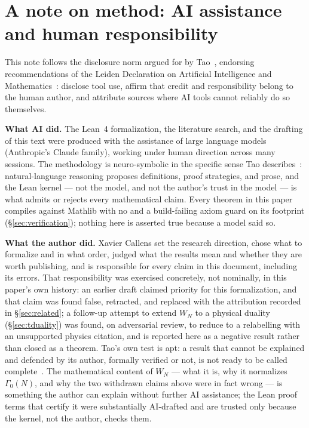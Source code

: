 \documentclass[11pt, a4paper]{article}
\newcommand{\lean}[1]{\ifmmode\text{\ttfamily\detokenize{#1}}\else{\ttfamily\detokenize{#1}}\fi}
\theoremstyle{remark}
\begin{document}
\section*{A note on method: AI assistance and human responsibility}

This note follows the disclosure norm argued for by Tao~\cite{Tao2026AI}, endorsing recommendations
of the Leiden Declaration on Artificial Intelligence and Mathematics~\cite{Leiden2026}: disclose
tool use, affirm that credit and responsibility belong to the human author, and attribute sources
where AI tools cannot reliably do so themselves.

\textbf{What AI did.} The Lean~4 formalization, the literature search, and the drafting of this
text were produced with the assistance of large language models (Anthropic's Claude family),
working under human direction across many sessions. The methodology is neuro-symbolic in the
specific sense Tao describes~\cite{Tao2026AI}: natural-language reasoning proposes definitions,
proof strategies, and prose, and the Lean kernel --- not the model, and not the author's trust in
the model --- is what admits or rejects every mathematical claim. Every theorem in this paper
compiles against Mathlib with no \lean{sorry} and a build-failing axiom guard on its footprint
(\S\ref{sec:verification}); nothing here is asserted true because a model said so.

\textbf{What the author did.} Xavier Callens set the research direction, chose what to formalize
and in what order, judged what the results mean and whether they are worth publishing, and is
responsible for every claim in this document, including its errors. That responsibility was
exercised concretely, not nominally, in this paper's own history: an earlier draft claimed priority
for this formalization, and that claim was found false, retracted, and replaced with the
attribution recorded in \S\ref{sec:related}; a follow-up attempt to extend $W_N$ to a physical
duality (\S\ref{sec:tduality}) was found, on adversarial review, to reduce to a relabelling with an
unsupported physics citation, and is reported here as a negative result rather than closed as a
theorem. Tao's own test is apt: a result that cannot be explained and defended by its author,
formally verified or not, is not ready to be called complete~\cite{Tao2026AI}. The mathematical
content of $W_N$ --- what it is, why it normalizes $\Gamma_0(N)$, and why the two withdrawn claims
above were in fact wrong --- is something the author can explain without further AI assistance;
the Lean proof terms that certify it were substantially AI-drafted and are trusted only because the
kernel, not the author, checks them.
\end{document}
